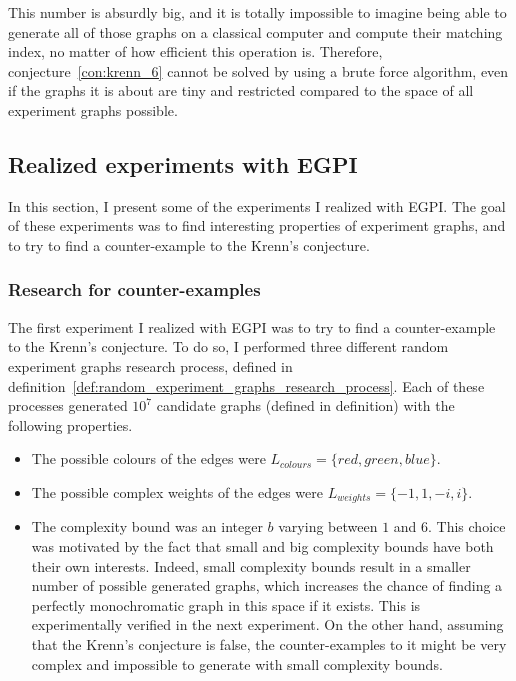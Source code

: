 This number is absurdly big, and it is totally impossible to imagine being able to generate all of those graphs on a classical computer and compute their matching index, no matter of how efficient this operation is.
Therefore, conjecture~\ref{con:krenn_6} cannot be solved by using a brute force algorithm, even if the graphs it is about are tiny and restricted compared to the space of all experiment graphs possible.


\subsection{Realized experiments with EGPI}
\label{subsec:realized_experiments}

In this section, I present some of the experiments I realized with EGPI. The goal of these experiments was to find interesting properties of experiment graphs, and to try to find a counter-example to the Krenn's conjecture.\\

\subsubsection{Research for counter-examples}

The first experiment I realized with EGPI was to try to find a counter-example to the Krenn's conjecture.
To do so, I performed three different random experiment graphs research process, defined in definition~\ref{def:random_experiment_graphs_research_process}.
Each of these processes generated $10^7$ candidate graphs (defined in definition) with the following properties.

\begin{itemize}
    \item The possible colours of the edges were $L_{colours} = \{red, green, blue\}$.
    \item The possible complex weights of the edges were $L_{weights} = \{-1, 1, -i, i\}$.
    \item The complexity bound was an integer $b$ varying between $1$ and $6$.
        This choice was motivated by the fact that small and big complexity bounds have both their own interests.
        Indeed, small complexity bounds result in a smaller number of possible generated graphs, which increases the chance of finding a perfectly monochromatic graph in this space if it exists.
        This is experimentally verified in the next experiment.
        On the other hand, assuming that the Krenn's conjecture is false, the counter-examples to it might be very complex and impossible to generate with small complexity bounds.
\end{itemize}

